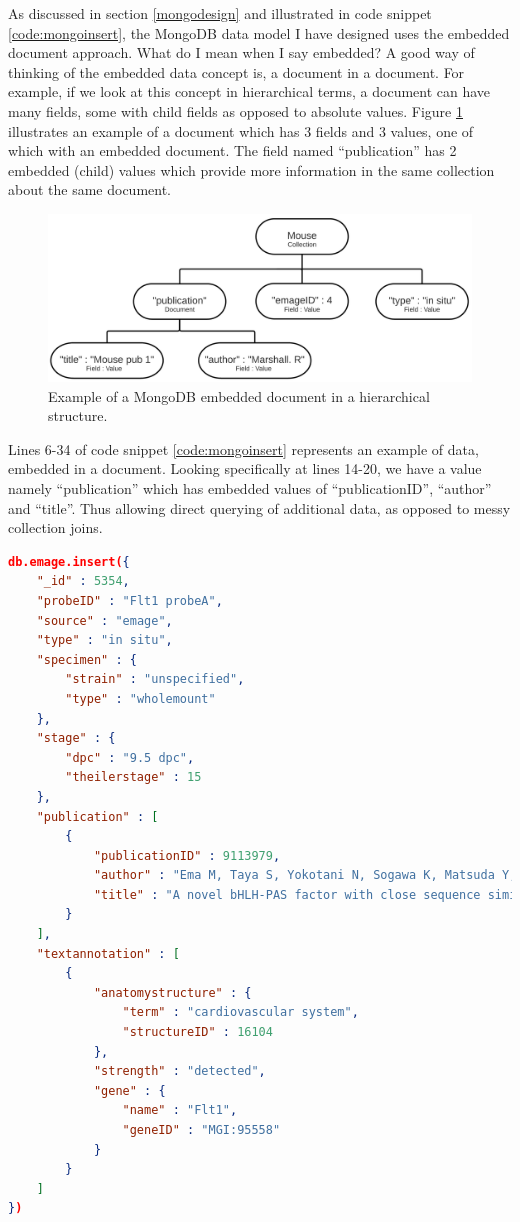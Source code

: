 As discussed in section \ref{mongodesign} and illustrated in code snippet \ref{code:mongoinsert}, the MongoDB data model I have designed uses the embedded document approach. What do I mean when I say embedded? A good way of thinking of the embedded data concept is, a document in a document. For example, if we look at this concept in hierarchical terms, a document can have many fields, some with child fields as opposed to absolute values. Figure \ref{fig:embedded} illustrates an example of a document which has 3 fields and 3 values, one of which with an embedded document. The field named ``publication'' has 2 embedded (child) values which provide more information in the same collection about the same document.\begin{figure}[H]\begin{center}\includegraphics[width=1\linewidth]{images/embeddedex}\caption{Example of a MongoDB embedded document in a hierarchical structure.}\label{fig:embedded}\end{center}\end{figure}
\parindent 0pt
Lines 6-34 of code snippet \ref{code:mongoinsert} represents an example of data, embedded in a document. Looking specifically at lines 14-20, we have a value namely ``publication'' which has embedded values of ``publicationID'', ``author'' and ``title''. Thus allowing direct querying of additional data, as opposed to messy collection joins.
\parindent 15pt
\newpage
\begin{lstlisting}[language=json,caption=Example insertion of data into a MongoDB document., label=code:mongoinsert]
db.emage.insert({
    "_id" : 5354,
    "probeID" : "Flt1 probeA",
    "source" : "emage",
    "type" : "in situ",
    "specimen" : {
        "strain" : "unspecified",
        "type" : "wholemount"
    },
    "stage" : {
        "dpc" : "9.5 dpc",
        "theilerstage" : 15
    },
    "publication" : [ 
        {
            "publicationID" : 9113979,
            "author" : "Ema M, Taya S, Yokotani N, Sogawa K, Matsuda Y, Fujii-Kuriyama Y",
            "title" : "A novel bHLH-PAS factor with close sequence similarity to hypoxia-inducible factor 1alpha regulates the VEGF expression and is potentially involved in lung and vascular development."
        }
    ],
    "textannotation" : [ 
        {
            "anatomystructure" : {
                "term" : "cardiovascular system",
                "structureID" : 16104
            },
            "strength" : "detected",
            "gene" : {
                "name" : "Flt1",
                "geneID" : "MGI:95558"
            }
        }
    ]
})
\end{lstlisting} 


